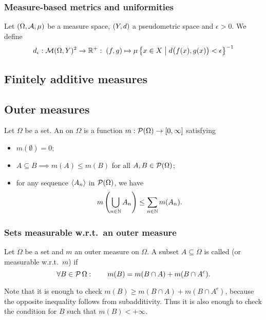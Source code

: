 \subsubsection{Measure-based metrics and uniformities}
\begin{definition}
Let $\left( \Omega, \mathcal{A}, \mu \right)$ be a measure space, $\left( Y,d \right)$ a pseudometric space and $\epsilon >0$. We define
\[ d_\epsilon: \operatorname{\mathcal{M}}(\Omega, Y)^2 \to \mathbb{R}^+: \; (f,g)\mapsto \mu\left\{ x\in X \;\middle|\; d\big(f(x),g(x)\big) < \epsilon \right\}^{-1} \]
\end{definition}

\subsection{Finitely additive measures}

\subsection{Outer measures}
\begin{definition}
Let $\Omega$ be a set. An  on $\Omega$ is a function $m: \operatorname{\mathcal{P}}(\Omega) \to [0,\infty]$ satisfying
\begin{itemize}
\item $m(\emptyset) = 0$;
\item $A\subseteq B \implies m(A) \leq m(B)$ for all $A,B\in\operatorname{\mathcal{P}}(\Omega)$;
\item for any sequence $\left\langle A_n \right\rangle$ in $\operatorname{\mathcal{P}}(\Omega)$, we have
\[ m\left(\bigcup_{n\in\mathbb{N}}A_n\right) \leq \sum_{n\in\mathbb{N}}m(A_n). \]
\end{itemize}
\end{definition}

\subsubsection{Sets measurable w.r.t.\ an outer measure}
\begin{definition}
Let $\Omega$ be a set and $m$ an outer measure on $\Omega$. A subset $A\subseteq \Omega$ is called  (or measurable w.r.t.\ $m$) if
\[ \forall B\in\operatorname{\mathcal{P}}{\Omega}: \qquad m(B) = m(B\cap A) + m(B\cap A^c). \]
\end{definition}
Note that it is enough to check $m(B) \geq m(B\cap A) + m(B\cap A^c)$, because the opposite inequality follows from subadditivity. Thus it is also enough to check the condition for $B$ such that $m(B) < +\infty$.

